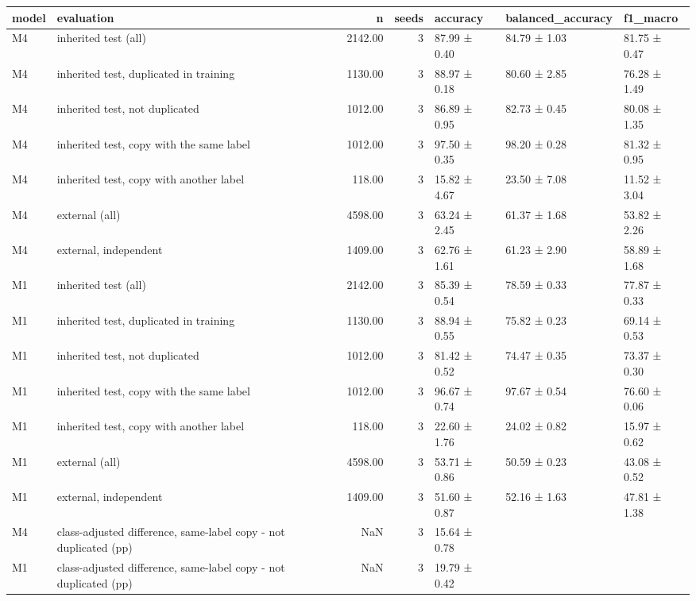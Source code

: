 \begin{tabular}{llrrlll}
\toprule
model & evaluation & n & seeds & accuracy & balanced\_accuracy & f1\_macro \\
\midrule
M4 & inherited test (all) & 2142.00 & 3 & 87.99 ± 0.40 & 84.79 ± 1.03 & 81.75 ± 0.47 \\
M4 & inherited test, duplicated in training & 1130.00 & 3 & 88.97 ± 0.18 & 80.60 ± 2.85 & 76.28 ± 1.49 \\
M4 & inherited test, not duplicated & 1012.00 & 3 & 86.89 ± 0.95 & 82.73 ± 0.45 & 80.08 ± 1.35 \\
M4 & inherited test, copy with the same label & 1012.00 & 3 & 97.50 ± 0.35 & 98.20 ± 0.28 & 81.32 ± 0.95 \\
M4 & inherited test, copy with another label & 118.00 & 3 & 15.82 ± 4.67 & 23.50 ± 7.08 & 11.52 ± 3.04 \\
M4 & external (all) & 4598.00 & 3 & 63.24 ± 2.45 & 61.37 ± 1.68 & 53.82 ± 2.26 \\
M4 & external, independent & 1409.00 & 3 & 62.76 ± 1.61 & 61.23 ± 2.90 & 58.89 ± 1.68 \\
M1 & inherited test (all) & 2142.00 & 3 & 85.39 ± 0.54 & 78.59 ± 0.33 & 77.87 ± 0.33 \\
M1 & inherited test, duplicated in training & 1130.00 & 3 & 88.94 ± 0.55 & 75.82 ± 0.23 & 69.14 ± 0.53 \\
M1 & inherited test, not duplicated & 1012.00 & 3 & 81.42 ± 0.52 & 74.47 ± 0.35 & 73.37 ± 0.30 \\
M1 & inherited test, copy with the same label & 1012.00 & 3 & 96.67 ± 0.74 & 97.67 ± 0.54 & 76.60 ± 0.06 \\
M1 & inherited test, copy with another label & 118.00 & 3 & 22.60 ± 1.76 & 24.02 ± 0.82 & 15.97 ± 0.62 \\
M1 & external (all) & 4598.00 & 3 & 53.71 ± 0.86 & 50.59 ± 0.23 & 43.08 ± 0.52 \\
M1 & external, independent & 1409.00 & 3 & 51.60 ± 0.87 & 52.16 ± 1.63 & 47.81 ± 1.38 \\
M4 & class-adjusted difference, same-label copy - not duplicated (pp) & NaN & 3 & 15.64 ± 0.78 &  &  \\
M1 & class-adjusted difference, same-label copy - not duplicated (pp) & NaN & 3 & 19.79 ± 0.42 &  &  \\
\bottomrule
\end{tabular}
